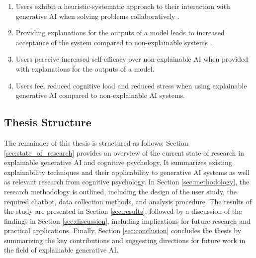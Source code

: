 \begin{enumerate}[label=(\textbf{H{\arabic*}}),leftmargin=4em]
    \item Users exhibit a heuristic-systematic approach to their interaction with generative \ac{AI} when solving problems collaboratively \parencite{Jussupow2021}.
    \item Providing explanations for the outputs of a model leads to increased acceptance of the system compared to non-explainable systems \parencite{Li2022}.
    \item Users perceive increased self-efficacy over non-explainable \ac{AI} when provided with explanations for the outputs of a model.
    \item Users feel reduced cognitive load and reduced stress when using explainable generative \ac{AI} compared to non-explainable \ac{AI} systems.
\end{enumerate}


\subsection{Thesis Structure} \label{subsec:thesis-structure}

The remainder of this thesis is structured as follows: Section \ref{sec:state_of_research} provides an overview of the current state of research in explainable generative \ac{AI} and cognitive psychology. It summarizes existing explainability techniques and their applicability to generative \ac{AI} systems as well as relevant research from cognitive psychology. In Section \ref{sec:methodology}, the research methodology is outlined, including the design of the user study, the required chatbot, data collection methods, and analysis procedure. The results of the study are presented in Section \ref{sec:results}, followed by a discussion of the findings in Section \ref{sec:discussion}, including implications for future research and practical applications. Finally, Section \ref{sec:conclusion} concludes the thesis by summarizing the key contributions and suggesting directions for future work in the field of explainable generative \ac{AI}.

